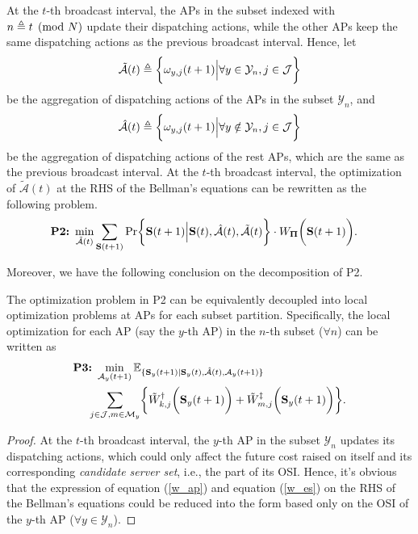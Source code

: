 At the $t$-th broadcast interval, the APs in the subset indexed with $n \triangleq t \pmod{N}$ update their dispatching actions, while the other APs keep the same dispatching actions as the previous broadcast interval.
Hence, let
\begin{align}
    \tilde{\mathcal{A}}(t) \triangleq \bigg\{ {\omega}_{y,j}(t+1) \Big| \forall y\in\mathcal{Y}_{n},j\in\mathcal{J} \bigg\}
\end{align}
be the aggregation of dispatching actions of the APs in the subset $\mathcal{Y}_{n}$, and
\begin{align}
    \hat{\mathcal{A}}(t) \triangleq \bigg\{ {\omega}_{y,j}(t+1) \Big| \forall y\notin\mathcal{Y}_{n}, j\in\mathcal{J}\bigg\}
\end{align}
be the aggregation of dispatching actions of the rest APs, which are the same as the previous broadcast interval.
At the $t$-th broadcast interval, the optimization of $\tilde{\mathcal{A}}(t)$ at the RHS of the Bellman's equations can be rewritten as the following problem.
{\small
\begin{align}
    \textbf{P2:}~
    \min_{ \tilde{\mathcal{A}}(t) }
    &\sum_{\Stat(t+1)} \Pr\Brace{
        \Stat(t+1) \Big| \Stat(t), \hat{\mathcal{A}}(t), \tilde{\mathcal{A}}(t)
    } \cdot W_{\Baseline}\Paren{\Stat(t+1)}.
\end{align}
}

Moreover, we have the following conclusion on the decomposition of P2.
\begin{lemma}[]
    The optimization problem in P2 can be equivalently decoupled into local optimization problems at APs {for each subset partition}.
    Specifically, {the local optimization for each AP (say the $y$-th AP) in the $n$-th subset ($\forall n$) can be written as}
    \small{\begin{align}
        &\textbf{P3:}~
        \min_{ {\mathcal{A}}_{y}(t+1) }
        \mathbb{E}_{\set{ \Stat_{y}(t+1)|\Stat_{y}(t), \hat{\mathcal{A}}(t), {\mathcal{A}}_{y}(t+1) }}
        \nonumber\\
        &~~~~\sum_{ j\in\jSpace,m\in\esSet_{y} } \Brace{
            \tilde{W}^{\AP}_{k,j}\Paren{\Stat_{y}(t+1)}
            +\tilde{W}^{\ES}_{m,j}\Paren{\Stat_{y}(t+1)}
        }.
        \label{eqn:partial}
    \end{align} }
    \label{lemma:w_partial}
\end{lemma}
\begin{proof}
    At the $t$-th broadcast interval, the $y$-th AP in the subset $\mathcal{Y}_{n}$ updates its dispatching actions, which could only affect the future cost raised on itself and its corresponding \emph{candidate server set}, i.e., the part of its OSI.
    Hence, it's obvious that the expression of equation (\ref{w_ap}) and equation (\ref{w_es}) on the RHS of the Bellman's equations could be reduced into the form based only on the OSI of the $y$-th AP ($\forall y\in\mathcal{Y}_{n}$).
\end{proof}

